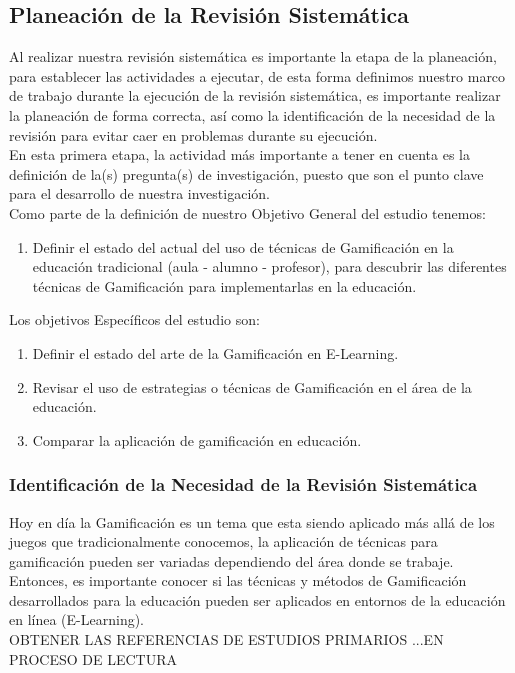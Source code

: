 \documentclass{report}
\begin{document}
    \subsection{Planeación de la Revisión Sistemática}
     Al realizar nuestra revisión sistemática es importante la etapa de la planeación, para establecer las actividades a ejecutar, de esta forma definimos nuestro marco de trabajo durante la ejecución de la revisión sistemática, es importante realizar la planeación de forma correcta, así como la identificación de la necesidad de la revisión para evitar caer en problemas durante su ejecución.\\
    	En esta primera etapa, la actividad más importante a tener en cuenta es la definición de la(s) pregunta(s) de investigación, puesto que son el punto clave para el desarrollo de nuestra investigación.\\
    	Como parte de la definición de nuestro Objetivo General del estudio tenemos:
        \begin{enumerate}
        	\item Definir el estado del actual del uso de técnicas de Gamificación en la educación tradicional (aula - alumno - profesor), para descubrir las diferentes técnicas de Gamificación para implementarlas en la educación.
        \end{enumerate}
Los objetivos Específicos del estudio son:
        \begin{enumerate}
        	\item Definir el estado del arte de la Gamificación en E-Learning.
        	\item Revisar el uso de estrategias o técnicas de Gamificación en el área de la educación.
        	\item Comparar la aplicación de gamificación en educación.
        \end{enumerate}

    	    \subsubsection{Identificación de la Necesidad de la Revisión Sistemática} \label{needs}
    	    
            Hoy en día la Gamificación es un tema que esta siendo aplicado más allá de los juegos que tradicionalmente conocemos, la aplicación de técnicas para gamificación pueden ser variadas dependiendo del área donde se trabaje. Entonces, es importante conocer si las técnicas y métodos de Gamificación desarrollados para la educación pueden ser aplicados en entornos de la educación en línea (E-Learning). \\
           OBTENER LAS REFERENCIAS DE ESTUDIOS PRIMARIOS ...EN PROCESO DE LECTURA
            
\end{document}
